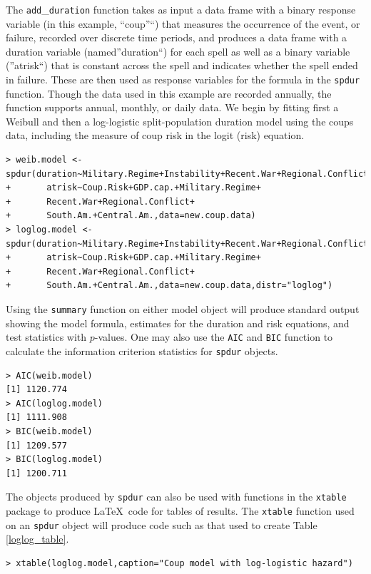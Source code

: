\documentclass[article]{jss}
\begin{document}
\normalsize
The \texttt{add}\_\texttt{duration} function takes as input a data frame
with a binary response variable (in this example, ``coup''``) that
measures the occurrence of the event, or failure, recorded over discrete
time periods, and produces a data frame with a duration variable
(named''duration``) for each spell as well as a binary variable
(''atrisk``) that is constant across the spell and indicates whether the
spell ended in failure. These are then used as response variables for
the formula in the \texttt{spdur} function. Though the data used in this
example are recorded annually, the function supports annual, monthly, or
daily data. We begin by fitting first a Weibull and then a log-logistic
split-population duration model using the coups data, including the
measure of coup risk in the logit (risk) equation. \small

\begin{verbatim}
> weib.model <- spdur(duration~Military.Regime+Instability+Recent.War+Regional.Conflict,
+       atrisk~Coup.Risk+GDP.cap.+Military.Regime+
+       Recent.War+Regional.Conflict+
+       South.Am.+Central.Am.,data=new.coup.data)
> loglog.model <- spdur(duration~Military.Regime+Instability+Recent.War+Regional.Conflict,
+       atrisk~Coup.Risk+GDP.cap.+Military.Regime+
+       Recent.War+Regional.Conflict+
+       South.Am.+Central.Am.,data=new.coup.data,distr="loglog")
\end{verbatim}

\normalsize  
Using the \texttt{summary} function on either model object will produce
standard output showing the model formula, estimates for the duration
and risk equations, and test statistics with \(p\)-values. One may also
use the \texttt{AIC} and \texttt{BIC} function to calculate the
information criterion statistics for \texttt{spdur} objects.\\\small

\begin{verbatim}
> AIC(weib.model)
[1] 1120.774
> AIC(loglog.model)
[1] 1111.908
> BIC(weib.model)
[1] 1209.577
> BIC(loglog.model)
[1] 1200.711
\end{verbatim}

\normalsize
The objects produced by \texttt{spdur} can also be used with functions
in the \texttt{xtable} package to produce \LaTeX~code for tables of
results. The \texttt{xtable} function used on an \texttt{spdur} object
will produce code such as that used to create Table \ref{loglog_table}.
\small

\begin{verbatim}
> xtable(loglog.model,caption="Coup model with log-logistic hazard")
\end{verbatim}
\end{document}
